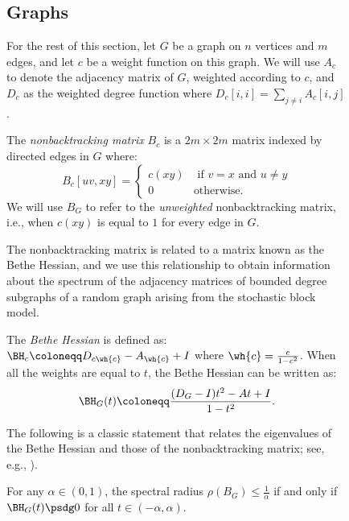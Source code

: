 \documentclass[11pt,letterpaper]{article}
\begin{document}
\begin{figure}
\subsection{Graphs} \label{sec:graph-prelims}

    For the rest of this section, let $G$ be a graph on $n$ vertices and $m$ edges, and let $c$ be a weight function on this graph.
    We will use $A_c$ to denote the adjacency matrix of $G$, weighted according to $c$, and $D_c$ as the weighted degree function where $D_c[i,i] = \sum_{j\ne i} A_c[i,j]$.
    \begin{definition}
        The \emph{nonbacktracking matrix} $B_c$ is a $2m\times 2m$ matrix indexed by directed edges in $G$ where:
        \[
            B_{c}[uv, xy] =
            \begin{cases}
                c(xy) &\text{ if }v=x\text{ and }u\ne y \\
                0 &\text{otherwise.}
            \end{cases}
        \]
        We will use $B_G$ to refer to the \emph{unweighted} nonbacktracking matrix, i.e., when $c(xy)$ is equal to $1$ for every edge in $G$.
    \end{definition}

    The nonbacktracking matrix is related to a matrix known as the Bethe Hessian, and we use this relationship to obtain information about the spectrum of the adjacency matrices of bounded degree subgraphs of a random graph arising from the stochastic block model.
    \begin{definition}
        \label{def:bethe-hessian}
        The \emph{Bethe Hessian} is defined as:
        \(
            \BH_{c} \coloneqq D_{c\wh{c}} - A_{\wh{c}} + I
        \)
        where $\wh{c} = \frac{c}{1-c^2}$.
        When all the weights are equal to $t$, the Bethe Hessian can be written as:
        \[
            \BH_G(t) \coloneqq \frac{(D_G-I)t^2 - At + I}{1-t^2}.
        \]
    \end{definition}

    The following is a classic statement that relates the eigenvalues of the Bethe Hessian and those of the nonbacktracking matrix; see, e.g., \cite[Proof of Theorem 5.1]{FM17}).
    \begin{lemma}
        For any $\alpha\in(0,1)$, the spectral radius $\rho(B_G) \le \frac{1}{\alpha}$ if and only if $\BH_G(t)\psdg 0$ for all $t\in(-\alpha,\alpha)$.
    \end{lemma}


\end{figure}
\end{document}
